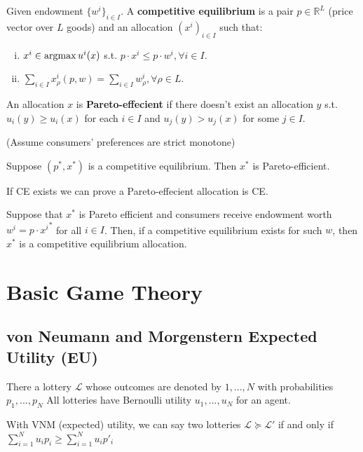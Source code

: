 \documentclass[11pt]{elegantbook}
\newcommand{\argmax}{\operatornamewithlimits{argmax}}
\begin{document}
\begin{definition}
    \normalfont
    Given endowment $\{w^i\}_{i\in I}$. A \textbf{competitive equilibrium} is a pair $p\in \mathbb{R}^L$ (price vector over $L$ goods) and an allocation $(x^i)_{i\in I}$ such that:
    \begin{enumerate}[(i).]
        \item $x^i\in \argmax u^i(x)$ s.t. $p\cdot x^i\leq p\cdot w^i, \forall i\in I$.
        \item $\sum_{i\in I}x^i_\rho (p,w)=\sum_{i\in I}w^i_\rho, \forall \rho\in L$.
    \end{enumerate}
\end{definition}

\begin{definition}
    \normalfont
    An allocation $x$ is \textbf{Pareto-effecient} if there doesn't exist an allocation $y$ s.t. $u_i(y)\geq u_i(x)$ for each $i\in I$ and $u_j(y)> u_j(x)$ for some $j\in I$.
\end{definition}

(Assume consumers' preferences are strict monotone)
\begin{theorem}
    Suppose $(p^*,x^*)$ is a competitive equilibrium. Then $x^*$ is Pareto-efficient.
\end{theorem}

If CE exists we can prove a Pareto-effecient allocation is CE.
\begin{theorem}
    Suppose that $x^*$ is Pareto efficient and consumers receive endowment worth $w^i=p\cdot {x^i}^*$ for all $i\in I$. Then, if a competitive equilibrium exists for such $w$, then $x^*$ is a competitive equilibrium allocation.
\end{theorem}


\section{Basic Game Theory}
\subsection{von Neumann and Morgenstern Expected Utility (EU)}
\begin{definition}
\normalfont
    There a lottery $\mathcal{L}$ whose outcomes are denoted by $1,...,N$ with probabilities $p_1,...,p_N$ All lotteries have Bernoulli utility $u_1,...,u_N$ for an agent.

    With VNM (expected) utility, we can say two lotteries $\mathcal{L}\succeq \mathcal{L}'$ if and only if $\sum_{i=1}^N u_ip_i\geq \sum_{i=1}^N u_ip'_i$
\end{definition}
\end{document}
